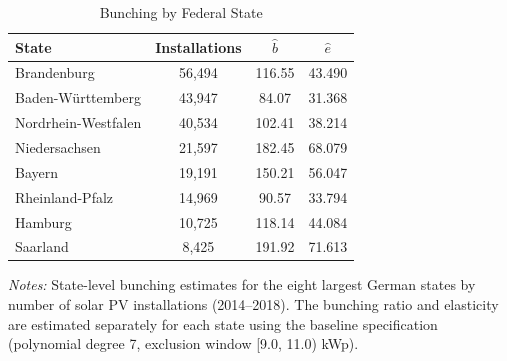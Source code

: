 \begin{table}[htbp]
\centering
\caption{Bunching by Federal State}
\label{tab:states}
\begin{tabular}{lccc}
\hline\hline
State & Installations & $\hat{b}$ & $\hat{e}$ \\
\hline
Brandenburg & 56,494 & 116.55 & 43.490 \\
Baden-Württemberg & 43,947 & 84.07 & 31.368 \\
Nordrhein-Westfalen & 40,534 & 102.41 & 38.214 \\
Niedersachsen & 21,597 & 182.45 & 68.079 \\
Bayern & 19,191 & 150.21 & 56.047 \\
Rheinland-Pfalz & 14,969 & 90.57 & 33.794 \\
Hamburg & 10,725 & 118.14 & 44.084 \\
Saarland & 8,425 & 191.92 & 71.613 \\
\hline\hline
\end{tabular}
\begin{tablenotes}
\small
\item \textit{Notes:} State-level bunching estimates for the eight largest German states by number of solar PV installations (2014--2018). The bunching ratio and elasticity are estimated separately for each state using the baseline specification (polynomial degree 7, exclusion window [9.0, 11.0) kWp).
\end{tablenotes}
\end{table}
